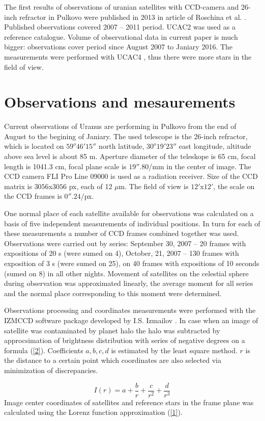 \documentclass[]{article}
\begin{document}
The first results of observations of uranian satellites with CCD-camera and 26-inch refractor in Pulkovo were published in 2013 in article of Roschina et al. \cite{1}. Published observations covered 2007 -- 2011 period. UCAC2 was used as a reference catalogue. Volume of observational data in current paper is much bigger: observations cover period since August 2007 to Janiary 2016. The measurements were performed with UCAC4 \cite{9}, thus there were more stars in the field of view.

\section{Observations and mesaurements}
Current observations of Uranus are performing in Pulkovo from the end of August to the begining of Janiary. The used telescope is the 26-inch refractor, which is located on $59^o46' 15''$ north latitude, $30^o19'23''$ east longitude, altitude above sea level is about 85 m.  Aperture diameter of the teleskope is 65 cm, focal length is 1041.3 cm, focal plane scale is $19''.80$/mm in the center of image. The CCD camera FLI Pro Line 09000  is used as a radiation receiver. Size of the CCD matrix is $3056$x$3056$ px, each of 12 $\mu$m.  The field of view is $12'$x$12'$, the scale on the CCD frames is $0''.24$/px.\par
One normal place of each satellite available for observations was calculated on a basis of five independent measurements of individual positions.  In turn for each of these measurements a number of CCD frames combined together was used. Observations were carried out by series: September 30, 2007 -- 20 frames with expositions of 20 s (were sumed on 4), October, 21, 2007 -- 130 frames with exposition of 3 s (were sumed on 25), on 40 frames with expositions of 10 seconds (sumed on 8) in all other nights. Movement of satellites on the celestial sphere during observation was approximated linearly, the average moment for all series and the normal place corresponding to this moment were determined.\par
Observations processing and coordinates measurements were performed with the IZMCCD software package developed by I.S. Izmailov \cite{3,4}. In case when an image of satellite was contaminated by planet halo the halo was subtracted by approcsimation of brightness distribution with series of negative degrees on a formula (\ref{2}). Coefficients $a, b, c, d$ is estimated by the least square method. $r$ is the distance to a certain point which coordinates are also selected via minimization of discrepancies.\par
\begin{equation}
\label{2}
I(r) = a + \frac{b}{r} + \frac{c}{r^2} + \frac{d}{r^3}
\end{equation}
Image center coordinates of satellites and reference stars in the frame plane was calculated using the Lorenz function approximation (\ref{1}).
\end{document}
